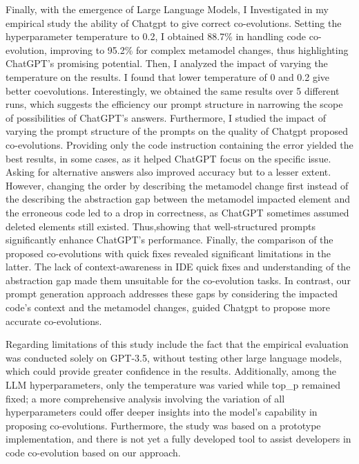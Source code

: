 Finally, with the emergence of Large Language Models, I Investigated in my empirical study the ability of Chatgpt to give correct co-evolutions. Setting the hyperparameter temperature to 0.2, I obtained  88.7\% in handling code co-evolution, improving to 95.2\% for complex metamodel changes, thus highlighting ChatGPT’s promising potential. Then, I analyzed the impact of varying the temperature on the results. I found that lower temperature of 0 and 0.2 give better coevolutions. Interestingly, we obtained the same results over 5 different runs, which suggests the efficiency our
prompt structure in narrowing the scope of possibilities of ChatGPT’s answers. Furthermore, I studied the impact of varying the prompt structure of the prompts on the quality of Chatgpt proposed co-evolutions. Providing only the code instruction containing the error yielded the best results, in some cases, as it helped ChatGPT focus on the specific issue. Asking for alternative answers also improved accuracy but to a lesser extent. However, changing the order by describing the metamodel change first instead of the describing the abstraction gap between the metamodel impacted element and the erroneous code led to a drop in correctness, as ChatGPT sometimes assumed deleted elements still existed. Thus,showing that well-structured prompts significantly enhance ChatGPT’s performance. Finally, the comparison of the proposed co-evolutions with quick fixes revealed significant limitations in the latter. The lack of context-awareness in IDE quick fixes and understanding of the abstraction gap made them unsuitable for the co-evolution tasks. In contrast, our prompt generation approach addresses these gaps by considering the impacted code’s context and the metamodel changes, guided Chatgpt to propose more accurate co-evolutions.

Regarding limitations of this study include the fact that the empirical evaluation was conducted solely on GPT-3.5, without testing other large language models, which could provide greater confidence in the results. Additionally, among the LLM hyperparameters, only the temperature was varied while top\_p remained fixed; a more comprehensive analysis involving the variation of all hyperparameters could offer deeper insights into the model's capability in proposing co-evolutions. Furthermore, the study was based on a prototype implementation, and there is not yet a fully developed tool to assist developers in code co-evolution based on our approach.
